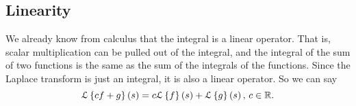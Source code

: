 \subsection{Linearity}
\noindent
We already know from calculus that the integral is a linear operator.
That is, scalar multiplication can be pulled out of the integral, and the integral of the sum of two functions is the same as the sum of the integrals of the functions.
Since the Laplace transform is just an integral, it is also a linear operator.
So we can say
\begin{equation*}
	\mathcal{L}\left\{ cf + g \right\}\left(s\right) = c\mathcal{L}\left\{ f \right\}\left(s\right) + \mathcal{L}\left\{ g \right\}\left(s\right) \text{, } c \in \mathbb{R}.
\end{equation*}